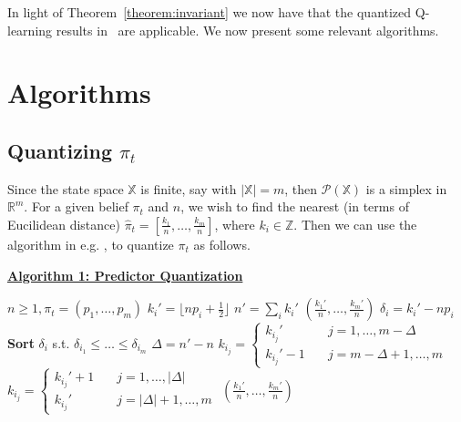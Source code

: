 \documentclass[conference]{IEEEtran}
\begin{document}
In light of Theorem~\ref{theorem:invariant} we now have that the quantized Q-learning results in~\cite{Kara} are applicable. We now present some relevant algorithms.

\section{Algorithms}\label{section:Algorithms}
\subsection{Quantizing \( \pi_t \)}\label{algorithm1}
Since the state space \( \mathbb{X} \) is finite, say with \( |\mathbb{X}| = m \), then \( \mathcal{P}(\mathbb{X}) \) is a simplex in \( \mathbb{R}^m \). For a given belief \( \pi_t \) and \( n \), we wish to find the nearest (in terms of Eucilidean distance) \( \hat{\pi}_t = [\frac{k_1}{n}, \ldots, \frac{k_m}{n}] \), where \( k_i \in \mathbb{Z} \). Then we can use the algorithm in e.g. \cite{Reznik}, \cite{Saldi} to quantize \(\pi_t\) as follows. %

\vspace{1em}

\noindent \underline{\textbf{Algorithm 1: Predictor Quantization}}

\begin{algorithmic}[1]
    \REQUIRE \( n\ge1, \pi_t = (p_1, \ldots, p_m) \)
    \STATE \(k_i' = \lfloor np_i + \frac{1}{2} \rfloor\)
    \ENDFOR
    \STATE \(n' = \sum_i k_i'\)
    \RETURN \((\frac{k_1'}{n}, \ldots, \frac{k_m'}{n})\)
    \ENDIF
    \STATE \( \delta_i = k_i' - np_i\)
    \ENDFOR
    \STATE \textbf{Sort} \( \delta_i \) s.t. \( \delta_{i_1} \le \ldots \le \delta_{i_m} \)
    \STATE \( \Delta = n'-n \)
    \STATE \(k_{i_j} = \begin{cases}
        k_{i_j}' \quad   & j = 1,\ldots,m-\Delta   \\
        k_{i_j}'-1 \quad & j = m-\Delta+1,\ldots,m
    \end{cases}\)
    \ELSE
    \STATE \(k_{i_j} = \begin{cases} k_{i_j}'+1 \quad & j = 1,\ldots,|\Delta| \\ k_{i_j}' \quad   & j = |\Delta|+1,\ldots,m \end{cases}\)
    \ENDIF
    \RETURN \((\frac{k_1'}{n}, \ldots, \frac{k_m'}{n}) \)
\end{algorithmic}
\end{document}
